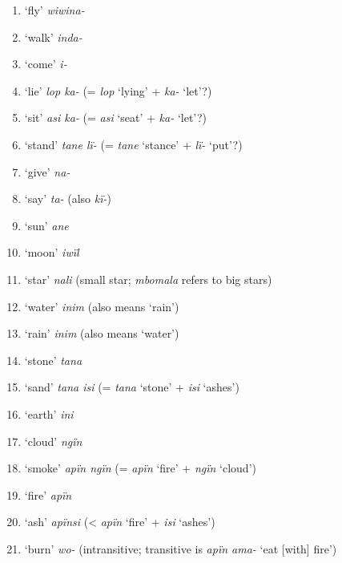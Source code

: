 \begin{enumerate}[noitemsep, label={\arabic*}, align=left, widest=190, labelsep=1ex,leftmargin=*]
\item ‘fly’ \textit{wiwina-}

\item ‘walk’ \textit{inda-}

\item ‘come’ \textit{i-}

\item ‘lie’ \textit{lop ka-} (= \textit{lop} ‘lying’ + \textit{ka-} ‘let’?)

\item ‘sit’ \textit{asi ka-} (= \textit{asi} ‘seat’ + \textit{ka-} ‘let’?)

\item ‘stand’ \textit{tane lï-} (= \textit{tane} ‘stance’ + \textit{lï-} ‘put’?)

\item ‘give’ \textit{na-}

\item ‘say’ \textit{ta-} (also \textit{kï-})

\item ‘sun’ \textit{ane}

\item ‘moon’ \textit{iwïl}

\item ‘star’ \textit{nali} (small star; \textit{mbomala} refers to big stars)

\item ‘water’ \textit{inim} (also means ‘rain’)

\item ‘rain’ \textit{inim} (also means ‘water’)

\item ‘stone’ \textit{tana}

\item ‘sand’ \textit{tana isi}  (= \textit{tana} ‘stone’ + \textit{isi} ‘ashes’)

\item ‘earth’ \textit{ini}

\item ‘cloud’ \textit{ngïn}

\item ‘smoke’ \textit{apïn ngïn} (= \textit{apïn} ‘fire’ + \textit{ngïn} ‘cloud’)

\item ‘fire’ \textit{apïn}

\item ‘ash’ \textit{apïnsi} (< \textit{apïn} ‘fire’ + \textit{isi} ‘ashes’)

\item ‘burn’ \textit{wo-} (intransitive; transitive is \textit{apïn ama-} ‘eat [with] fire’)


\end{enumerate}
